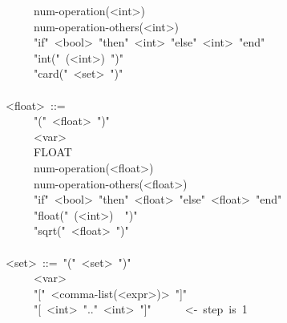 \begin{mdpre}
~~~~\textbar{}~num-operation({\textless{}int\textgreater{}})\\
~~~~\textbar{}~num-operation-others({\textless{}int\textgreater{}})\\
~~~~\textbar{}~"if"~{\textless{}bool\textgreater{}}~"then"~{\textless{}int\textgreater{}}~"else"~{\textless{}int\textgreater{}}~"end"\\
~~~~\textbar{}~"int("~({\textless{}int\textgreater{}})~")"\\
~~~~\textbar{}~"card("~{\textless{}set\textgreater{}}~")"\\
\\
{\textless{}float\textgreater{}}~::=\\
~~~~\textbar{}~"("~{\textless{}float\textgreater{}}~")"\\
~~~~\textbar{}~{\textless{}var\textgreater{}}\\
~~~~\textbar{}~FLOAT\\
~~~~\textbar{}~num-operation({\textless{}float\textgreater{}})\\
~~~~\textbar{}~num-operation-others({\textless{}float\textgreater{}})\\
~~~~\textbar{}~"if"~{\textless{}bool\textgreater{}}~"then"~{\textless{}float\textgreater{}}~"else"~{\textless{}float\textgreater{}}~"end"\\
~~~~\textbar{}~"float("~({\textless{}int\textgreater{}})~~")"\\
~~~~\textbar{}~"sqrt("~{\textless{}float\textgreater{}}~")"\\
\\
{\textless{}set\textgreater{}}~::=~"("~{\textless{}set\textgreater{}}~")"\\
~~~~\textbar{}~{\textless{}var\textgreater{}}\\
~~~~\textbar{}~"{}["~{\textless{}comma-list(\textless{}expr\textgreater{})\textgreater{}}~"]"\\
~~~~\textbar{}~"{}[~{\textless{}int\textgreater{}}~".."~{\textless{}int\textgreater{}}~"]"~~~~~~{\textless{}-~step~is~1}\\

\end{mdpre}
